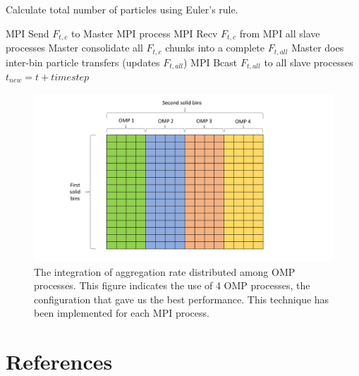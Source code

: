 \documentclass[preprint,11pt,authoryear]{elsarticle}
\begin{document}
\begin{algorithm}[H]
\begin{algorithmic}[1]
        \EndFor
            \State  Calculate total number of particles using Euler's rule. 
        
        \EndFor
            \State MPI Send $F_{t,c}$ to Master MPI process
            \State MPI Recv $F_{t,c}$ from MPI all slave processes
            \State Master consolidate all $F_{t,c}$ chunks into a complete $F_{t,all}$
            \State Master does inter-bin particle transfers (updates $F_{t,all}$)
            \State MPI Bcast $F_{t,all}$ to all slave processes
            \State $t_{new} = t + timestep$
        \EndWhile   
        
    \end{algorithmic}
\end{algorithm}  
 
\begin{figure}[H]
\centering
\includegraphics[scale=0.5]{OMP_table.pdf}
\caption{The integration of aggregation rate distributed among OMP processes. This figure indicates the use of 4 OMP processes, the 
configuration that gave us the best performance. This technique has been implemented for each MPI process.}
\label{fig:app_OMP_distribution}
\end{figure}	

\section*{References} 


\end{document}
